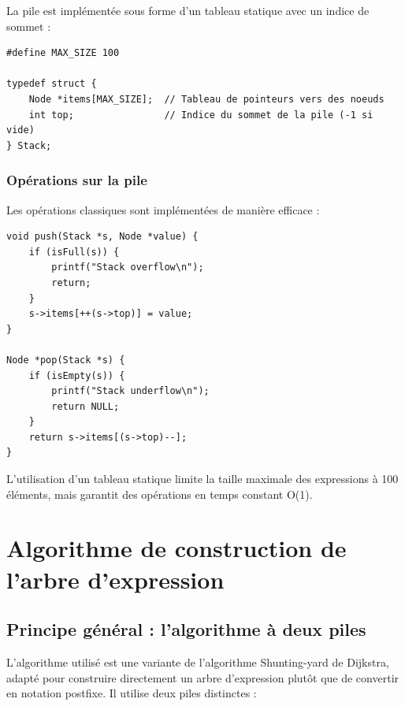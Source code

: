 \documentclass[12pt,a4paper]{article}
\begin{document}
La pile est implémentée sous forme d'un tableau statique avec un indice de sommet :

\begin{lstlisting}[caption={Structure Stack dans stack.h}]
#define MAX_SIZE 100

typedef struct {
    Node *items[MAX_SIZE];  // Tableau de pointeurs vers des noeuds
    int top;                // Indice du sommet de la pile (-1 si vide)
} Stack;
\end{lstlisting}

\subsubsection{Opérations sur la pile}

Les opérations classiques sont implémentées de manière efficace :

\begin{lstlisting}[caption={Opérations push et pop}]
void push(Stack *s, Node *value) {
    if (isFull(s)) {
        printf("Stack overflow\n");
        return;
    }
    s->items[++(s->top)] = value;
}

Node *pop(Stack *s) {
    if (isEmpty(s)) {
        printf("Stack underflow\n");
        return NULL;
    }
    return s->items[(s->top)--];
}
\end{lstlisting}

L'utilisation d'un tableau statique limite la taille maximale des expressions à 100 éléments, mais garantit des opérations en temps constant O(1).

\section{Algorithme de construction de l'arbre d'expression}

\subsection{Principe général : l'algorithme à deux piles}

L'algorithme utilisé est une variante de l'algorithme Shunting-yard de Dijkstra, adapté pour construire directement un arbre d'expression plutôt que de convertir en notation postfixe. Il utilise deux piles distinctes :
\end{document}
